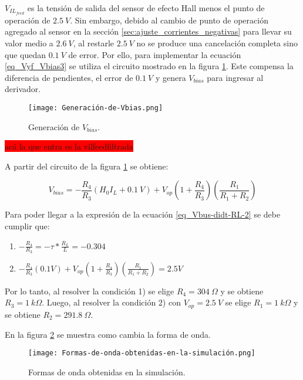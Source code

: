 $V_{IL_{feed}}$ es la tensión de salida del sensor de efecto Hall menos el punto de operación de $2.5\:V$. Sin embargo, debido al cambio de punto de operación agregado al sensor en la sección \ref{sec:ajuste_corrientes_negativas} para llevar su valor medio a $2.6\:V$, al restarle $2.5\:V$ no se produce una cancelación completa sino que quedan $0.1\:V$ de error. Por ello, para implementar la ecuación  \ref{eq_Vyf_Vbias3} se utiliza el circuito mostrado en la figura \ref{fig:img_Generación_de_Vbias}. Este compensa la diferencia de pendientes, el error de $0.1\:V$ y genera $V_{bias}$ para ingresar al derivador.

\begin{figure}[H]
	\centering
	\texttt{[image: Generación-de-Vbias.png]}
	\caption{Generación de $V_{bias}$.}
	\label{fig:img_Generación_de_Vbias}
\end{figure}

\colorbox{red}{acá la que entra es la  vilfeedfiltrada}

A partir del circuito de la figura \ref{fig:img_Generación_de_Vbias} se obtiene:

\begin{equation} \label{eq_Vyf-Vbias3}
	V_{bias} =-\frac{R_4}{R_3}(H_0I_L+ 0.1\:V)+V_{op}(1+\frac{ R_4}{R_3})(\frac{R_1}{R_1+R_2})
\end{equation}

Para poder llegar a la expresión de la ecuación \ref{eq_Vbus-didt-RL-2} se debe cumplir que:

\begin{enumerate}
	\item  $-\frac{R_4}{R_3}=- \tau *\frac{R_L}{L}= -0.304$  
	
	\item  $-\frac{R_4}{R_3}(0.1V)+V_{op}(1+\frac{ R_4}{R_3})(\frac{R_1}{R_1+R_2}) = 2.5V$     
\end{enumerate}

Por lo tanto, al resolver la condición 1) se elige $R_4 = 304\: \Omega$ y se obtiene $R_3=1\:k\Omega$. Luego, al resolver la condición 2) con $V_{op}=2.5\:V$ se elige $R_1=1\:k\Omega$ y se obtiene $R_{2}=291.8\:\Omega$.

En la figura \ref{fig:img_Formas_de_onda_obtenidas_en_la_simulación} se muestra como cambia la forma de onda.

\begin{figure}[H]
	\centering
	\texttt{[image: Formas-de-onda-obtenidas-en-la-simulación.png]}
	\caption{Formas de onda obtenidas en la simulación.}
	\label{fig:img_Formas_de_onda_obtenidas_en_la_simulación}
\end{figure}


